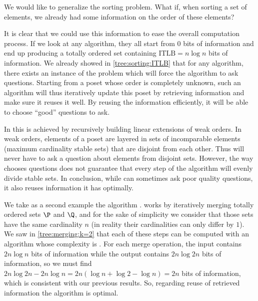 
We would like to generalize the sorting problem. What if, when sorting a set of
elements, we already had some information on the order of these elements?


It is clear that we could use this information to ease the overall computation
process. If we look at any  algorithm, they all start from
$0$ bits of information and end up producing a totally ordered set containing
$\text{ITLB}= n \log n$ bits of information. We already showed in
\ref{tree:sorting:ITLB} that for any algorithm, there exists an instance of the
problem which will force the algorithm to ask  questions.
Starting from a poset whose order is completely unknown, such an algorithm will
thus iteratively update this poset by retrieving information and make sure it
reuses it well. By reusing the information efficiently, it will be able to
choose ``good'' questions to ask.


In \quicksort this is achieved by recursively building linear extensions of weak
orders. In weak orders, elements of a poset are layered in sets of incomparable
elements (maximum cardinality stable sets) that are disjoint from each other.
Thus \quicksort will never have to ask a question about elements from disjoint
sets. However, the way \quicksort chooses questions does not guarantee that every
step of the algorithm will evenly divide stable sets. In conclusion, while
\quicksort can sometimes ask poor quality questions, it also reuses information
it has optimally.


We take as a second example the algorithm \mergesort. \mergesort works by
iteratively merging totally ordered sets $\P$ and $\Q$, and for the sake of
simplicity we consider that those sets have the same cardinality $n$  (in
reality their cardinalities can only differ by $1$). We saw in
\ref{tree:merging:k=2} that each of these steps can be computed with an
algorithm whose complexity is . For each merge operation, the input
contains $2n \log n$ bits of information while the output contains $2n \log 2n$
bits of information, so we must find $2n \log 2n - 2n \log n = 2n (\log n +
\log 2 - \log n) = 2n$ bits of information, which is consistent with our
previous results. So, regarding reuse of retrieved information the \mergesort
algorithm is optimal.

